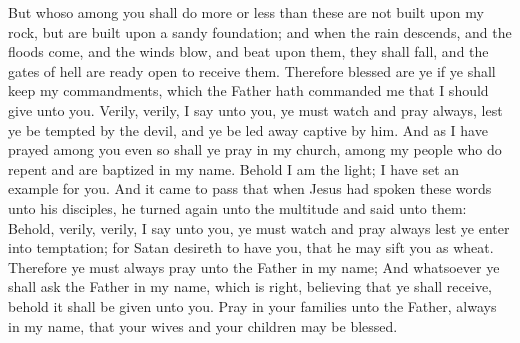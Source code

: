 But whoso among you shall do more or less than these are not built upon my rock, but are built upon a sandy foundation; and when the rain descends, and the floods come, and the winds blow, and beat upon them, they shall fall, and the gates of hell are ready open to receive them.
\bverse \iffalse Therefore blessed are ye if ye shall keep my commandments, which the Father hath commanded me that I should give unto you. \fi
Therefore blessed are ye if ye shall keep my commandments, which the Father hath commanded me that I should give unto you.
\bverse \iffalse Verily, verily, I say unto you, ye must watch and pray always, lest ye be tempted by the devil, and ye be led away captive by him. \fi
Verily, verily, I say unto you, ye must watch and pray always, lest ye be tempted by the devil, and ye be led away captive by him.
\bverse \iffalse And as I have prayed among you even so shall ye pray in my church, among my people who do repent and are baptized in my name. Behold I am the light; I have set an example for you. \fi
And as I have prayed among you even so shall ye pray in my church, among my people who do repent and are baptized in my name. Behold I am the light; I have set an example for you.
\bverse \iffalse And it came to pass that when Jesus had spoken these words unto his disciples, he turned again unto the multitude and said unto them: \fi
And it came to pass that when Jesus had spoken these words unto his disciples, he turned again unto the multitude and said unto them:
\bverse \iffalse Behold, verily, verily, I say unto you, ye must watch and pray always lest ye enter into temptation; for Satan desireth to have you, that he may sift you as wheat. \fi
Behold, verily, verily, I say unto you, ye must watch and pray always lest ye enter into temptation; for Satan desireth to have you, that he may sift you as wheat.
\bverse \iffalse Therefore ye must always pray unto the Father in my name; \fi
Therefore ye must always pray unto the Father in my name;
\bverse \iffalse And whatsoever ye shall ask the Father in my name, which is right, believing that ye shall receive, behold it shall be given unto you. \fi
And whatsoever ye shall ask the Father in my name, which is right, believing that ye shall receive, behold it shall be given unto you.
\bverse \iffalse Pray in your families unto the Father, always in my name, that your wives and your children may be blessed. \fi
Pray in your families unto the Father, always in my name, that your wives and your children may be blessed.
